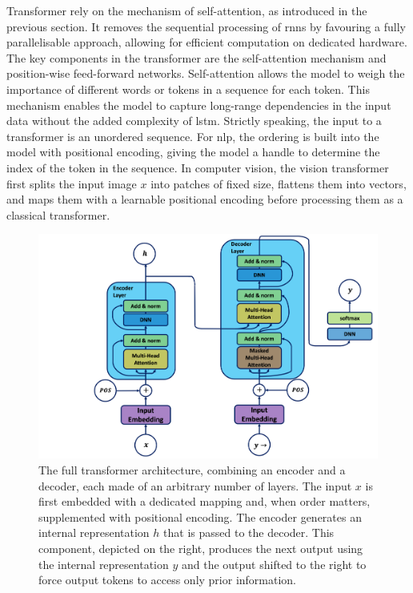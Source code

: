 Transformer rely on the mechanism of self-attention, as introduced in the previous section. It removes the sequential processing of \glspl{rnn} by favouring a fully parallelisable approach, allowing for efficient computation on dedicated hardware. The key components in the transformer are the self-attention mechanism and position-wise feed-forward networks. Self-attention allows the model to weigh the importance of different words or tokens in a sequence for each token. This mechanism enables the model to capture long-range dependencies in the input data without the added complexity of \gls{lstm}. Strictly speaking, the input to a transformer is an unordered sequence. For \gls{nlp}, the ordering is built into the model with positional encoding, giving the model a handle to determine the index of the token in the sequence. In computer vision, the vision transformer first splits the input image $x$ into patches of fixed size, flattens them into vectors, and maps them with a learnable positional encoding before processing them as a classical transformer.

\begin{figure}[h!]
    \center
    \includegraphics[width=\textwidth]{Images/ML/transformer.png}
    \caption{The full transformer architecture, combining an encoder and a decoder, each made of an arbitrary number of layers. The input $x$ is first embedded with a dedicated mapping and, when order matters, supplemented with positional encoding. The encoder generates an internal representation $h$ that is passed to the decoder. This component, depicted on the right, produces the next output using the internal representation $y$ and the output shifted to the right to force output tokens to access only prior information.} 
    \label{fig:tranfoArchi}
\end{figure}

